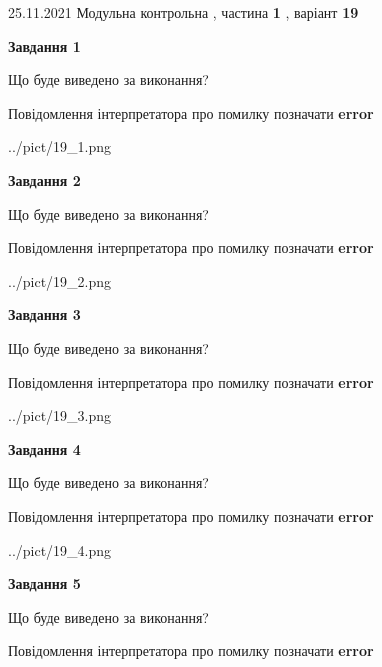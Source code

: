 \documentclass[10pt, ukrainian]{article}
\begin{document}
{25.11.2021 Модульна контрольна , частина \textbf { 1 }, варіант  \No \textbf { 19 }\par}
{
\begin {large}

{\begin {center}\textbf{Завдання 1}\end {center}}\par
Що буде виведено за виконання? \par
Повідомлення інтерпретатора про помилку позначати \textbf{error}

\begin{center}
	{../pict/19_1.png}
\end{center}
\newpage

{\begin {center}\textbf{Завдання 2}\end {center}}\par
Що буде виведено за виконання? \par
Повідомлення інтерпретатора про помилку позначати \textbf{error}

\begin{center}
	{../pict/19_2.png}
\end{center}
\newpage

{\begin {center}\textbf{Завдання 3}\end {center}}\par
Що буде виведено за виконання? \par
Повідомлення інтерпретатора про помилку позначати \textbf{error}

\begin{center}
	{../pict/19_3.png}
\end{center}
\newpage

{\begin {center}\textbf{Завдання 4}\end {center}}\par
Що буде виведено за виконання? \par
Повідомлення інтерпретатора про помилку позначати \textbf{error}

\begin{center}
	{../pict/19_4.png}
\end{center}
\newpage

{\begin {center}\textbf{Завдання 5}\end {center}}\par
Що буде виведено за виконання? \par
Повідомлення інтерпретатора про помилку позначати \textbf{error}


\end{large}}
\end{document}
